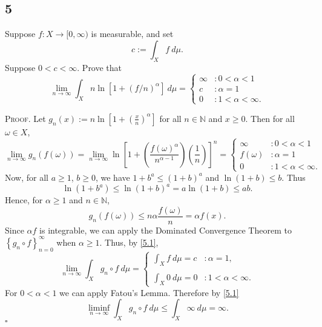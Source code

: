 \documentclass[12pt]{article}
\newcounter{ProofCounter}
\newenvironment{Proof}{\stepcounter{ProofCounter}\textsc{Proof.}}{\hfill$\square$}
\begin{document}
\subsection*{5}
\begin{tcolorbox}
Suppose $f : X \rightarrow [0, \infty)$ is measurable, and set 
\[ c := \int_{X}f\ d\mu. \]
Suppose $0 < c < \infty$. Prove that 
\[ \lim_{n\rightarrow\infty}\int_{X}n\ln[1 + (f/n)^{\alpha}]\ d\mu = \left\{ \begin{array}{cl}
\infty & : 0 < \alpha < 1 \\
c & : \alpha = 1 \\
0 & : 1 < \alpha < \infty.
\end{array} \right.
\]
\end{tcolorbox}



\begin{Proof}
Let $g_{n}(x) := n\ln\left[ 1 + \left( \frac{x}{n} \right)^{\alpha} \right]$ for all $n \in \mathbb{N}$ and $x \geq 0$. Then for all $\omega \in X$,
\begin{equation}
\lim_{n\rightarrow\infty}g_{n}(f(\omega)) = \lim_{n\rightarrow\infty}\ln\left[ 1 + \left( \frac{f(\omega)^{\alpha}}{n^{\alpha - 1}} \right)\left( \frac{1}{n} \right)
 \right]^{n} = \left\{ \begin{array}{cl}
\infty & : 0 < \alpha < 1 \\
f(\omega) & : \alpha = 1 \\
0 & : 1 < \alpha < \infty.
\end{array} \right.
\label{5.1}
\end{equation}
Now, for all $a \geq 1$, $b \geq 0$, we have $1 + b^{a} \leq (1 + b)^{a}$ and $\ln(1 + b) \leq b$. Thus 
\[ \ln(1 + b^{a}) \leq \ln(1 + b)^{a} = a \ln(1 + b) \leq a b. \]
Hence, for $\alpha \geq 1$ and $n \in \mathbb{N}$,
\[ g_{n}(f(\omega)) \leq n\alpha\frac{f(\omega)}{n} = \alpha f(x). \]
Since $\alpha f$ is integrable, we can apply the Dominated Convergence Theorem to $\left\{ g_{n}\circ f \right\}_{n=0}^{\infty}$ when $\alpha \geq 1$. 
Thus, by \eqref{5.1},
\[ \lim_{n\rightarrow\infty}\int_{X}g_{n}\circ f\ d\mu = \left\{\begin{array}{ll}
\int_{X}f\ d\mu = c & : \alpha = 1,\\ \\
\int_{X}0\ d\mu = 0 & : 1 < \alpha < \infty.
\end{array} \right.
\]
For $0 < \alpha < 1$ we can apply Fatou's Lemma. Therefore by \eqref{5.1} 
\[ \liminf_{n\rightarrow\infty}\int_{X}g_{n}\circ f\ d\mu \leq \int_{X}\infty\ d\mu = \infty. \]
\end{Proof}
\end{document}
